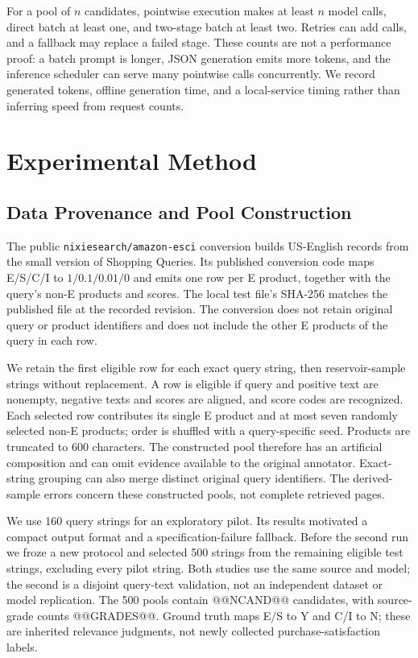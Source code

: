 \documentclass[conference]{IEEEtran}
\begin{document}
For a pool of $n$ candidates, pointwise execution makes at least $n$ model calls, direct batch at least one, and two-stage batch at least two. Retries can add calls, and a fallback may replace a failed stage. These counts are not a performance proof: a batch prompt is longer, JSON generation emits more tokens, and the inference scheduler can serve many pointwise calls concurrently. We record generated tokens, offline generation time, and a local-service timing rather than inferring speed from request counts.

\section{Experimental Method}
\subsection{Data Provenance and Pool Construction}
The public \texttt{nixiesearch/amazon-esci} conversion \cite{derived} builds US-English records from the small version of Shopping Queries. Its published conversion code maps E/S/C/I to $1/0.1/0.01/0$ and emits one row per E product, together with the query's non-E products and scores. The local test file's SHA-256 matches the published file at the recorded revision. The conversion does not retain original query or product identifiers and does not include the other E products of the query in each row.

We retain the first eligible row for each exact query string, then reservoir-sample strings without replacement. A row is eligible if query and positive text are nonempty, negative texts and scores are aligned, and score codes are recognized. Each selected row contributes its single E product and at most seven randomly selected non-E products; order is shuffled with a query-specific seed. Products are truncated to 600 characters. The constructed pool therefore has an artificial composition and can omit evidence available to the original annotator. Exact-string grouping can also merge distinct original query identifiers. The derived-sample errors concern these constructed pools, not complete retrieved pages.

We use 160 query strings for an exploratory pilot. Its results motivated a compact output format and a specification-failure fallback. Before the second run we froze a new protocol and selected 500 strings from the remaining eligible test strings, excluding every pilot string. Both studies use the same source and model; the second is a disjoint query-text validation, not an independent dataset or model replication. The 500 pools contain @@NCAND@@ candidates, with source-grade counts @@GRADES@@. Ground truth maps E/S to Y and C/I to N; these are inherited relevance judgments, not newly collected purchase-satisfaction labels.
\end{document}
